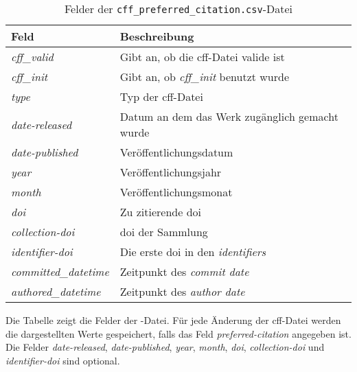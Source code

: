 \begin{table}
    \begin{tabularx}{\textwidth}{XL{10.2cm}}
        \toprule
        \textbf{Feld}              & \textbf{Beschreibung}                               \\ \midrule
        \emph{cff\_valid}          & Gibt an, ob die \gls{cff}-Datei valide ist          \\
        \emph{cff\_init}           & Gibt an, ob \emph{cff\_init} benutzt wurde          \\
        \emph{type}                & Typ der \gls{cff}-Datei                             \\
        \emph{date-released}       & Datum an dem das Werk zugänglich gemacht wurde      \\
        \emph{date-published}      & Veröffentlichungsdatum                              \\
        \emph{year}                & Veröffentlichungsjahr                               \\
        \emph{month}               & Veröffentlichungsmonat                              \\
        \emph{doi}                 & Zu zitierende \gls{doi}                             \\
        \emph{collection-doi}      & \gls{doi} der Sammlung                              \\
        \emph{identifier-doi}      & Die erste \gls{doi} in den \emph{identifiers} \\
        \emph{committed\_datetime} & Zeitpunkt des \emph{commit date}                    \\
        \emph{authored\_datetime}  & Zeitpunkt des \emph{author date}                    \\
        \bottomrule
    \end{tabularx}
    \caption{Felder der \texttt{cff\_preferred\_citation.csv}-Datei}
    \label{tab:cff_preferred_citation}
    \small
    Die Tabelle zeigt die Felder der -Datei. Für jede Änderung der \gls{cff}-Datei werden die dargestellten Werte gespeichert, falls das Feld \emph{preferred-citation} angegeben ist. Die Felder \emph{date-released}, \emph{date-published}, \emph{year}, \emph{month}, \emph{doi}, \emph{collection-doi} und \emph{identifier-doi} sind optional.
\end{table}

